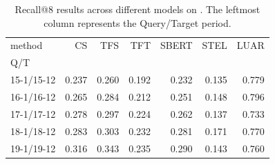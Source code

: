 \begin{table}[th]
    \centering
\begin{tabular}{lrrrrrr}
    \toprule
method & CS & TFS & TFT & SBERT & STEL & LUAR \\
Q/T &  &  &  &  &  &  \\
\midrule
15-1/15-12 & 0.237 & 0.260 & 0.192 & 0.232 & 0.135 & 0.779 \\
16-1/16-12 & 0.265 & 0.284 & 0.212 & 0.251 & 0.148 & 0.796 \\
17-1/17-12 & 0.278 & 0.297 & 0.224 & 0.262 & 0.137 & 0.733 \\
18-1/18-12 & 0.283 & 0.303 & 0.232 & 0.281 & 0.171 & 0.770 \\
19-1/19-12 & 0.316 & 0.343 & 0.235 & 0.290 & 0.143 & 0.760 \\
\bottomrule
\end{tabular}
    \caption{Recall@8 results across different models on \DSfixeddelta{}. The leftmost column represents the Query/Target period.}
    \label{tab:temporal_fixed}
\end{table}

